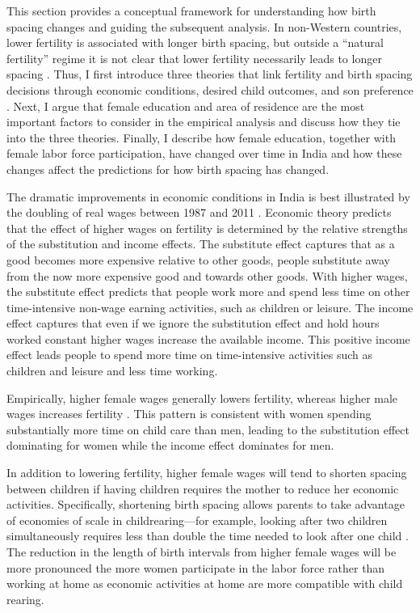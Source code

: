 This section provides a conceptual framework for understanding how birth spacing changes
and guiding the subsequent analysis.
In non-Western countries, lower fertility is associated with longer birth spacing, but 
outside a ``natural fertility'' regime it is not clear that lower fertility necessarily 
leads to longer spacing \citet{Newman1988,Rutstein2011,Casterline2016}.
Thus, I first introduce three theories that link fertility and birth spacing decisions
through economic conditions, desired child outcomes, and son preference \citep{Casterline2016,Portner2018}.
Next, I argue that female education and area of residence are the most important factors 
to consider in the empirical analysis and discuss how they tie into the three theories.
Finally, I describe how female education, together with female labor force participation, 
have changed over time in India and how these changes affect the predictions for how birth 
spacing has changed.

The dramatic improvements in economic conditions in India is best illustrated by the 
doubling of real wages between 1987 and 2011 \citep{Klasen2015}.
Economic theory predicts that the effect of higher wages on fertility is determined by 
the relative strengths of the substitution and income effects.
The substitute effect captures that as a good becomes more expensive relative to other
goods, people substitute away from the now more expensive good and towards other goods.
With higher wages, the substitute effect predicts that people work more and spend less 
time on other time-intensive non-wage earning activities, such as children or leisure.
The income effect captures that even if we ignore the substitution effect and hold hours 
worked constant higher wages increase the available income. 
This positive income effect leads people to spend more time on time-intensive activities 
such as children and leisure and less time working.

Empirically, higher female wages generally lowers fertility, whereas higher male 
wages increases fertility \citet{Hotz1997,schultz97}.
This pattern is consistent with women spending substantially more time on child care 
than men, leading to the substitution effect dominating for women while the income
effect dominates for men.

In addition to lowering fertility, higher female wages will tend to shorten spacing between 
children if having children requires the mother to reduce her economic activities.
Specifically, shortening birth spacing allows parents to take advantage of economies of 
scale in childrearing---for example, looking after two children simultaneously requires 
less than double the time needed to look after one child \citep{Vijverberg1982,Hotz1997}.
The reduction in the length of birth intervals from higher female wages will be more 
pronounced the more women participate in the labor force rather than working at home as 
economic activities at home are more compatible with child rearing.


